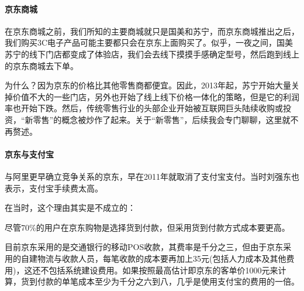 \documentclass[letterpaper,10pt,english]{sphinxmanual}
\begin{document}
\paragraph{京东商城}
\label{\detokenize{chapter_AI_company/jd:id3}}
在京东商城之前，我们所知的主要商城就只是国美和苏宁，而京东商城推出之后，我们购买3C电子产品可能主要都只会在京东上面购买了。似乎，一夜之间，国美苏宁的线下门店都变成了体验店，我们会去线下摸摸手感确定型号，然后跑到线上的京东商城去下单。

为什么？因为京东的价格比其他零售商都便宜。因此，2013年起，苏宁开始大量关掉价值不大的一些门店，另外也开始了线上线下价格一体化的策略，但是它的利润率也开始下跌。然后，传统零售行业的头部企业开始被互联网巨头陆续收购或投资，“新零售”的概念被炒作了起来。关于“新零售”，后续我会专门聊聊，这里就不再赘述。


\paragraph{京东与支付宝}
\label{\detokenize{chapter_AI_company/jd:id4}}
与阿里更早确立竞争关系的京东，早在2011年就取消了支付宝支付。当时刘强东也表示，支付宝手续费太高。
%
\begin{footnote}[1019]\sphinxAtStartFootnote
{}
%
\end{footnote}

在当时，这个理由其实是不成立的：

尽管70\%的用户在京东购物是选择货到付款，但采用货到付款方式成本要更高。

目前京东采用的是交通银行的移动POS收款，其费率是千分之三，但由于京东采用的自建物流与收款人员，每笔收款的成本要再加上3\sphinxhyphen{}5元(包括人力成本及其他费用)，这还不包括系统建设费用。如果按照最高估计即京东的客单价1000元来计算，货到付款的单笔成本至少为千分之六到八，几乎是使用支付宝的费用的一倍。%
\begin{footnote}[1020]\sphinxAtStartFootnote
{}
%
\end{footnote}
\end{document}

